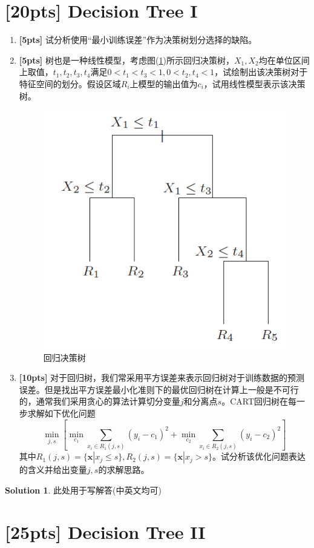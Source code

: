 \documentclass[a4paper,UTF8]{article}
\theoremstyle{definition}
\newtheorem*{solution}{Solution}
\begin{document}
\newpage
\section{[20pts] Decision Tree I}
\begin{enumerate}[(1)]
	\item \textbf{[5pts]} 试分析使用“最小训练误差”作为决策树划分选择的缺陷。
	\item \textbf{[5pts]}  树也是一种线性模型，考虑图(\ref{img})所示回归决策树，$X_1,X_2$均在单位区间上取值，$t_1,t_2,t_3,t_4$满足$0<t_1<t_3<1,0<t_2,t_4<1$，试绘制出该决策树对于特征空间的划分。假设区域$R_i$上模型的输出值为$c_i$，试用线性模型表示该决策树。
	\begin{figure}[htbp]
		\centering
		\includegraphics[width=.4\textwidth]{figure/regression_tree.png} %
		\caption{回归决策树} %
		\label{img} %
	\end{figure}
	\item \textbf{[10pts]} 对于回归树，我们常采用平方误差来表示回归树对于训练数据的预测误差。但是找出平方误差最小化准则下的最优回归树在计算上一般是不可行的，通常我们采用贪心的算法计算切分变量$j$和分离点$s$。CART回归树在每一步求解如下优化问题
	$$\min _{j, s}\left[\min _{c_1} \sum_{x_{i} \in R_{1}(j, s)}\left(y_{i}-c_{1}\right)^{2}+\min _{c_{2}} \sum_{x_{i} \in R_{2}(j, s)}\left(y_{i}-c_{2}\right)^{2}\right]$$
	其中$R_1(j,s)=\{\boldsymbol{x}|x_j\leq s\},R_2(j,s)=\{\boldsymbol{x}|x_j>s\}$。试分析该优化问题表达的含义并给出变量$j,s$的求解思路。
\end{enumerate}

\begin{solution}
	此处用于写解答(中英文均可)
\end{solution}

\section{[25pts] Decision Tree II}
\end{document}
